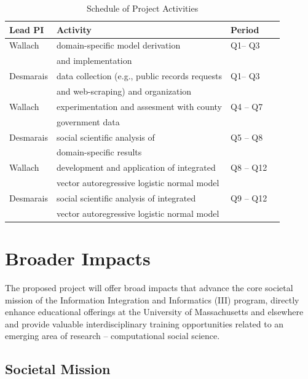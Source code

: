 \begin{table}[h]
\caption{Schedule of Project Activities}
\begin{center}
\begin{tabular}{|l|l|l|l|}
\hline
{\bf Lead PI} & {\bf Activity} & {\bf Period} \\ \hline
Wallach & domain-specific model derivation   &   Q1-- Q3 \\ 
& and implementation &  \\ \hline
Desmarais & data collection (e.g., public records requests  & Q1-- Q3 \\
&  and web-scraping)  and organization & \\ \hline
Wallach & experimentation and assesment with county & Q4 -- Q7 \\
&  government data & \\ \hline
Desmarais & social scientific analysis  of & Q5 -- Q8 \\
& domain-specific results & \\ \hline
Wallach & development and application of integrated & Q8 -- Q12 \\
& vector autoregressive logistic normal model & \\ \hline
Desmarais & social scientific analysis of integrated & Q9 -- Q12 \\
& vector autoregressive logistic normal model & \\ \hline

\end{tabular}
\end{center}
\label{schedule}
\end{table}%



\section{Broader Impacts}

The proposed project will offer broad impacts that advance the core societal mission of the Information Integration and Informatics (III) program, directly enhance educational offerings at the University of Massachusetts and elsewhere and provide valuable interdisciplinary training opportunities related to an emerging area of research -- computational social science.

\subsection{Societal Mission}

